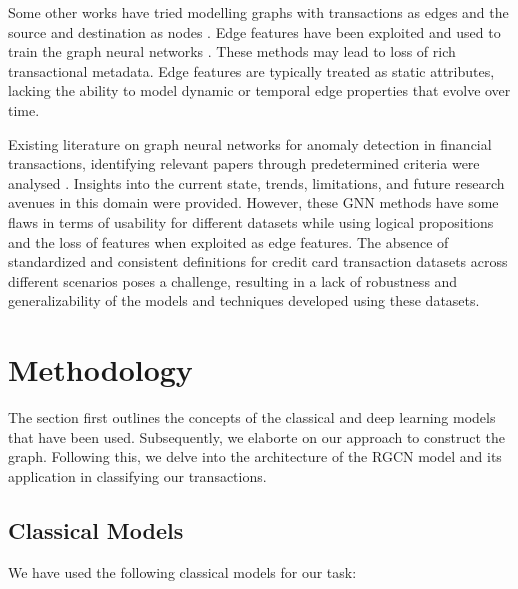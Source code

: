 \documentclass[pdflatex,sn-mathphys-num]{sn-jnl}%
\begin{document}
Some other works have tried modelling graphs with transactions as edges and the source and destination as nodes \cite{sardana2023}. Edge features have been exploited and used to train the graph neural networks \cite{gong2019}. These methods may lead to loss of rich transactional metadata. Edge features are typically treated as static attributes, lacking the ability to model dynamic or temporal edge properties that evolve over time.

Existing literature on graph neural networks for anomaly detection in financial transactions, identifying relevant papers through predetermined criteria were analysed \cite{motie2024}. Insights into the current state, trends, limitations, and future research avenues in this domain were provided.
However, these GNN methods have some flaws in terms of usability for different datasets while using logical propositions and the loss of features when exploited as edge features. The absence of standardized and consistent definitions for credit card transaction datasets across different scenarios poses a challenge, resulting in a lack of robustness and generalizability of the models and techniques developed using these datasets.



\section{Methodology}\label{sec3}

The section first outlines the concepts of the classical and deep learning models that have been used. Subsequently, we elaborte on our approach to construct the graph. Following this, we delve into the architecture of the RGCN model and its application in classifying our transactions.

\subsection{Classical Models}\label{subsec3}

We have used the following classical models for our task:
\end{document}

